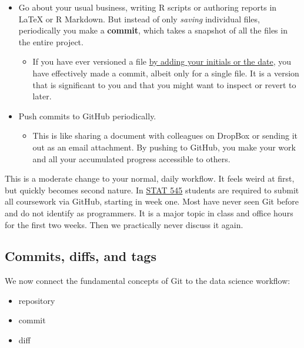 \documentclass[12pt]{article}
\providecommand{\tightlist}{%
  \setlength{\itemsep}{0pt}\setlength{\parskip}{0pt}}
\begin{document}
\begin{itemize}
\tightlist
\item
  Go about your usual business, writing R scripts or authoring reports
  in LaTeX or R Markdown. But instead of only \emph{saving} individual
  files, periodically you make a \textbf{commit}, which takes a snapshot
  of all the files in the entire project.

  \begin{itemize}
  \tightlist
  \item
    If you have ever versioned a file
    \href{http://www.phdcomics.com/comics/archive.php?comicid=1531}{by
    adding your initials or the date}, you have effectively made a
    commit, albeit only for a single file. It is a version that is
    significant to you and that you might want to inspect or revert to
    later.
  \end{itemize}
\item
  Push commits to GitHub periodically.

  \begin{itemize}
  \tightlist
  \item
    This is like sharing a document with colleagues on DropBox or
    sending it out as an email attachment. By pushing to GitHub, you
    make your work and all your accumulated progress accessible to
    others.
  \end{itemize}
\end{itemize}

This is a moderate change to your normal, daily workflow. It feels weird
at first, but quickly becomes second nature. In
\href{http://stat545.com}{STAT 545} students are required to submit all
coursework via GitHub, starting in week one. Most have never seen Git
before and do not identify as programmers. It is a major topic in class
and office hours for the first two weeks. Then we practically never
discuss it again.

\subsection{Commits, diffs, and tags}\label{commits-diffs-and-tags}

We now connect the fundamental concepts of Git to the data science
workflow:

\begin{itemize}
\tightlist
\item
  repository
\item
  commit
\item
  diff
\end{itemize}
\end{document}
